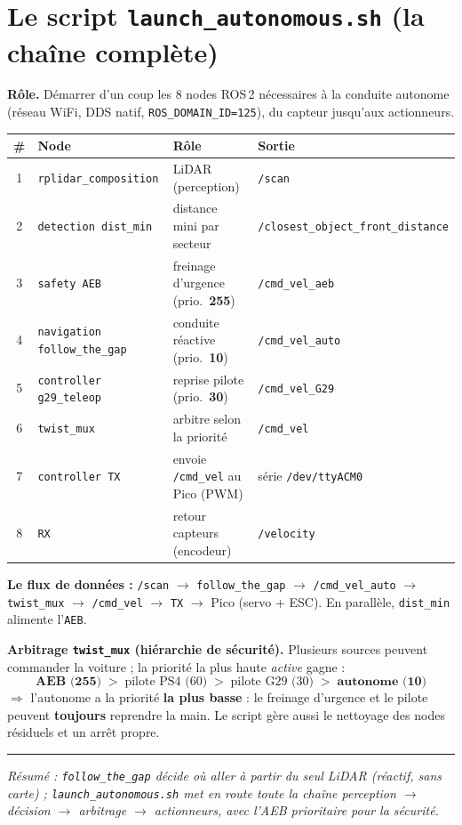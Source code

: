 \documentclass[a4paper,10pt]{article}
\begin{document}
\section{Le script \texttt{launch\_autonomous.sh} (la chaîne complète)}
\textbf{Rôle.} Démarrer d'un coup les 8 nodes ROS\,2 nécessaires à la conduite autonome
(réseau WiFi, DDS natif, \texttt{ROS\_DOMAIN\_ID=125}), du capteur jusqu'aux actionneurs.

\begin{table}[h]
\centering\small
\begin{tabularx}{\textwidth}{@{}c l X l@{}}
\toprule
\# & Node & Rôle & Sortie \\
\midrule
1 & \texttt{rplidar\_composition}        & LiDAR (perception)                   & \texttt{/scan} \\
2 & \texttt{detection dist\_min}          & distance mini par secteur            & \texttt{/closest\_object\_front\_distance} \\
3 & \texttt{safety AEB}                   & freinage d'urgence (prio.\ \textbf{255}) & \texttt{/cmd\_vel\_aeb} \\
4 & \texttt{navigation follow\_the\_gap}  & conduite réactive (prio.\ \textbf{10})   & \texttt{/cmd\_vel\_auto} \\
5 & \texttt{controller g29\_teleop}       & reprise pilote (prio.\ \textbf{30})      & \texttt{/cmd\_vel\_G29} \\
6 & \texttt{twist\_mux}                   & arbitre selon la priorité            & \texttt{/cmd\_vel} \\
7 & \texttt{controller TX}                & envoie \texttt{/cmd\_vel} au Pico (PWM) & série \texttt{/dev/ttyACM0} \\
8 & \texttt{RX}                           & retour capteurs (encodeur)           & \texttt{/velocity} \\
\bottomrule
\end{tabularx}
\end{table}

\textbf{Le flux de données :}
\texttt{/scan} $\rightarrow$ \texttt{follow\_the\_gap} $\rightarrow$ \texttt{/cmd\_vel\_auto}
$\rightarrow$ \texttt{twist\_mux} $\rightarrow$ \texttt{/cmd\_vel} $\rightarrow$ \texttt{TX}
$\rightarrow$ Pico (servo + ESC). En parallèle, \texttt{dist\_min} alimente l'\texttt{AEB}.

\textbf{Arbitrage \texttt{twist\_mux} (hiérarchie de sécurité).} Plusieurs sources peuvent
commander la voiture ; la priorité la plus haute \emph{active} gagne :
\[
\textbf{AEB (255)} \;>\; \text{pilote PS4 (60)} \;>\; \text{pilote G29 (30)} \;>\; \textbf{autonome (10)}
\]
$\Rightarrow$ l'autonome a la priorité \textbf{la plus basse} : le freinage d'urgence et le
pilote peuvent \textbf{toujours} reprendre la main. Le script gère aussi le nettoyage des nodes
résiduels et un arrêt propre.

\vspace{4pt}\hrule\vspace{3pt}
{\footnotesize\itshape Résumé : \texttt{follow\_the\_gap} décide \emph{où aller} à partir du
seul LiDAR (réactif, sans carte) ; \texttt{launch\_autonomous.sh} met en route toute la chaîne
perception $\rightarrow$ décision $\rightarrow$ arbitrage $\rightarrow$ actionneurs, avec l'AEB
prioritaire pour la sécurité.}
\end{document}
